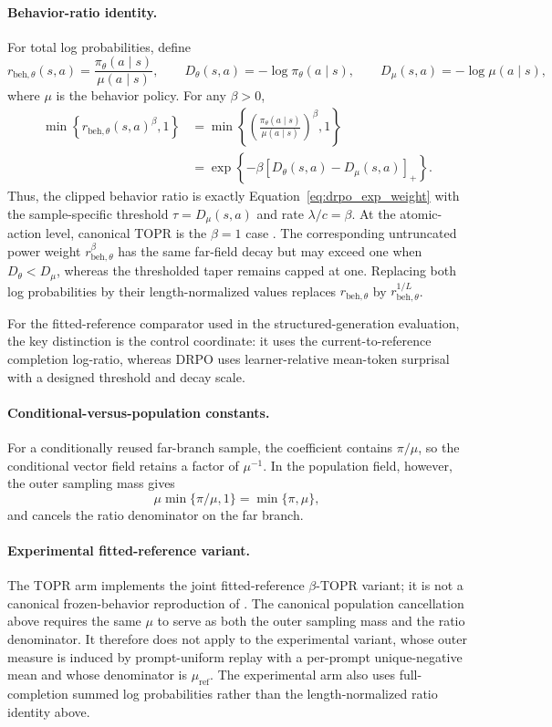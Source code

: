 \documentclass{article}
\theoremstyle{plain}
\theoremstyle{definition}
\theoremstyle{remark}
\begin{document}
\paragraph{Behavior-ratio identity.}
For total log probabilities, define
\[
r_{\mathrm{beh},\theta}(s,a)
=
\frac{\pi_\theta(a\mid s)}{\mu(a\mid s)},
\qquad
D_\theta(s,a)
=
-\log\pi_\theta(a\mid s),
\qquad
D_\mu(s,a)
=
-\log\mu(a\mid s),
\]
where \(\mu\) is the behavior policy. For any \(\beta>0\),
\[
\begin{aligned}
\min\left\{
    r_{\mathrm{beh},\theta}(s,a)^\beta,
    1
\right\}
&=
\min\left\{
    \left(
        \frac{\pi_\theta(a\mid s)}
             {\mu(a\mid s)}
    \right)^\beta,
    1
\right\} \\
&=
\exp\left\{
    -\beta
    \left[
        D_\theta(s,a)-D_\mu(s,a)
    \right]_+
\right\}.
\end{aligned}
\]
Thus, the clipped behavior ratio is exactly
Equation~\eqref{eq:drpo_exp_weight} with the sample-specific threshold
\(\tau=D_\mu(s,a)\) and rate \(\lambda/c=\beta\). At the atomic-action
level, canonical TOPR is the \(\beta=1\) case
\citep{leroux2025tapered}. The corresponding untruncated power weight
\(r_{\mathrm{beh},\theta}^{\beta}\) has the same far-field decay but may
exceed one when \(D_\theta<D_\mu\), whereas the thresholded taper remains
capped at one. Replacing both log probabilities by their
length-normalized values replaces
\(r_{\mathrm{beh},\theta}\) by
\(r_{\mathrm{beh},\theta}^{1/L}\).

For the fitted-reference comparator used in the structured-generation evaluation, the key distinction is the control coordinate: it uses the current-to-reference completion log-ratio, whereas DRPO uses learner-relative mean-token surprisal with a designed threshold and decay scale.

\paragraph{Conditional-versus-population constants.}

For a conditionally reused far-branch sample, the coefficient contains
\(\pi/\mu\), so the conditional vector field retains a factor of
\(\mu^{-1}\). In the population field, however, the outer sampling mass
gives
\[
\mu\min\{\pi/\mu,1\}
=
\min\{\pi,\mu\},
\]
and cancels the ratio denominator on the far branch.

\paragraph{Experimental fitted-reference variant.}
The TOPR arm implements the joint fitted-reference
\(\beta\)-TOPR variant; it is not a canonical frozen-behavior
reproduction of \citet{leroux2025tapered}. The canonical population
cancellation above requires the same \(\mu\) to serve as both the outer
sampling mass and the ratio denominator. It therefore does not apply to
the experimental variant, whose outer measure is induced by
prompt-uniform replay with a per-prompt unique-negative mean and whose
denominator is \(\mu_{\mathrm{ref}}\). The experimental arm also uses
full-completion summed log probabilities rather than the
length-normalized ratio identity above.
\end{document}
